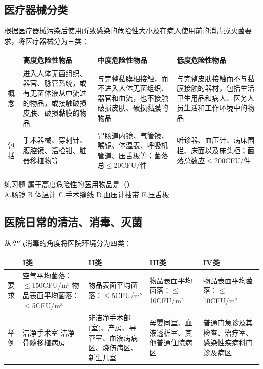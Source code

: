 \documentclass[11pt, a4paper]{ctexart}
\begin{document}
\subsection{医疗器械分类}
根据医疗器械污染后使用所致感染的危险性大小及在病人使用前的消毒或灭菌要求，将医疗器械分为三类：
\begin{table}[htbp]
	\centering
	\begin{tabular}{|p{3cm}|p{4cm}|p{4cm}|p{4cm}|}
		\hline
		   & \textbf{高度危险性物品}                               & \textbf{中度危险性物品}                             & \textbf{低度危险性物品}                              \\
		\hline
		概念 & 进入人体无菌组织、器官、脉管系统，或有无菌体液从中流过的物品，或接触破损皮肤、破损黏膜的物品 & 与完整黏膜相接触，而不进入人体无菌组织、器官和血流，也不接触破损皮肤、破损黏膜的物品   & 与完整皮肤接触而不与黏膜接触的器材，包括生活卫生用品和病人、医务人员生活和工作环境中的物品 \\
		\hline
		包括 & 手术器械、穿刺针、腹腔镜、活检钳、脏器移植物等                        & 胃肠道内镜、气管镜、喉镜、体温表、呼吸机管道、压舌板等；菌落总$\leq$20CFU/件 & 听诊器、血压计、病床围栏、床面以及床头柜；菌落总数应$\leq$200CFU/件      \\
		\hline
	\end{tabular}
\end{table}

\begin{examplebox}{练习题}
	属于高度危险性的医用物品是（\qquad）\\
	A.肠镜 \quad B.体温计 \quad C.手术缝线 \quad D.血压计袖带 \quad E.压舌板
\end{examplebox}

\subsection{医院日常的清洁、消毒、灭菌}
从空气消毒的角度将医院环境分为四类：
\begin{table}[htbp]
	\centering
	\begin{tabular}{|p{2cm}|p{3.5cm}|p{3.5cm}|p{3.5cm}|p{3.5cm}|}
		\hline
		   & \textbf{I类}                                   & \textbf{II类}                     & \textbf{III类}           & \textbf{IV类}              \\
		\hline
		要求 & 空气平均菌落：$\leq$150CFU/m³ 物品表面平均菌落：$\leq$5CFU/m³ & 物品表面平均菌落：$\leq$5CFU/m²           & 物品表面平均菌落：$\leq$10CFU/m² & 物品表面平均菌落：$\leq$10CFU/m²   \\
		\hline
		举例 & 洁净手术室 洁净骨髓移植病房                                & 非洁净手术部(室)、产房、导管室、血液病病区、烧伤病区、新生儿室 & 母婴同室、血液透析室、其他普通住院病区     & 普通门急诊及其检查、治疗室、感染性疾病科门诊及病区 \\
		\hline
	\end{tabular}
\end{table}
\end{document}
